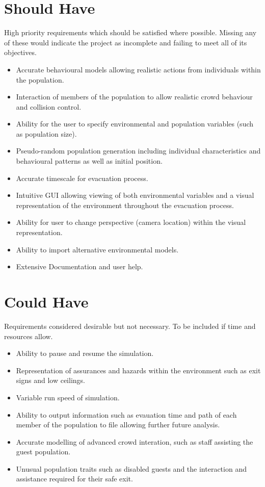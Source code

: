 \section{Should Have}

High priority requirements which should be satisfied where possible.
Missing any of these would indicate the project as incomplete and
failing to meet all of its objectives.
\begin{itemize}
\item Accurate behavioural models allowing realistic actions from individuals
within the population.
\item Interaction of members of the population to allow realistic crowd
behaviour and collision control.
\item Ability for the user to specify environmental and population variables
(such as population size).
\item Pseudo-random population generation including individual characteristics
and behavioural patterns as well as initial position.
\item Accurate timescale for evacuation process.
\item Intuitive GUI allowing viewing of both environmental variables and
a visual representation of the environment throughout the evacuation
process.
\item Ability for user to change perspective (camera location) within the
visual representation.
\item Ability to import alternative environmental models.
\item Extensive Documentation and user help.
\end{itemize}

\section{Could Have}

Requirements considered desirable but not necessary. To be included
if time and resources allow.
\begin{itemize}
\item Ability to pause and resume the simulation.
\item Representation of assurances and hazards within the environment such
as exit signs and low ceilings.
\item Variable run speed of simulation.
\item Ability to output information such as evauation time and path of each
member of the population to file allowing further future analysis.
\item Accurate modelling of advanced crowd interation, such as staff assisting
the guest population.
\item Unusual population traits such as disabled guests and the interaction
and assistance required for their safe exit.
\end{itemize}

